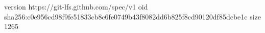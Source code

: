 version https://git-lfs.github.com/spec/v1
oid sha256:c0e956cd98f9fe51833cb8c6fe0749b43f8082dd6b825f8cd90120df85dcbe1c
size 1265

